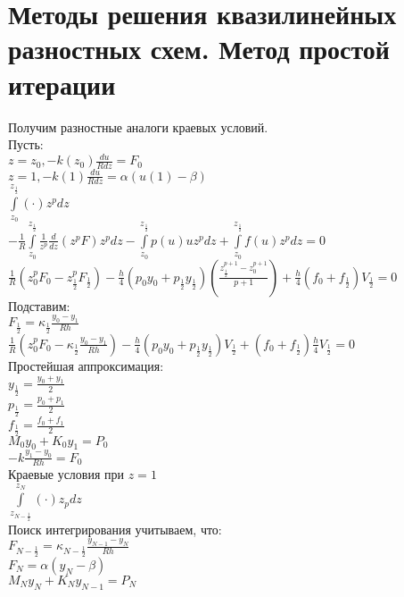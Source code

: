 \section{Методы решения квазилинейных разностных схем. Метод простой итерации}
Получим разностные аналоги краевых условий.\\
Пусть:\\
$z = z_0, -k(z_0)\frac{du}{R dz} = F_0$\\
$z = 1, -k(1) \frac{du}{R dz} = \alpha(u(1) - \beta)$\\
$\int\limits_{z_0}^{z_{\frac{1}{2}}}(\cdot)z^p dz$\\
$-\frac{1}{R}\int\limits_{z_0}^{z_{\frac{1}{2}}}\frac{1}{z^p} \frac{d}{dz} (z^p F) z^p dz - \int\limits_{z_0}^{z_{\frac{1}{2}}} p(u) u z^p dz + \int\limits_{z_0}^{z_{\frac{1}{2}}} f(u) z^p dz = 0$\\
$\frac{1}{R} (z_0^p F_0 - z^p_{\frac{1}{2}} F_{\frac{1}{2}}) - \frac{h}{4}(p_0 y_0 + p_{\frac{1}{2}} y_{\frac{1}{2}})(\frac{z^{p+1}_{\frac{1}{2}} - z_0^{p+1}}{p+1}) + \frac{h}{4}(f_0 + f_{\frac{1}{2}})V_{\frac{1}{2}} = 0$\\

Подставим:\\
$F_{\frac{1}{2}} = \kappa_{\frac{1}{2}} \frac{y_0 - y_1}{Rh}$\\
$\frac{1}{R}(z_0^p F_0 - \kappa_{\frac{1}{2}}\frac{y_0 - y_1}{Rh}) - \frac{h}{4}(p_0 y_0 + p_{\frac{1}{2}} y_{\frac{1}{2}}) V_{\frac{1}{2}} + (f_0 + f_{\frac{1}{2}})\frac{h}{4} V_{\frac{1}{2}} = 0$\\
Простейшая аппроксимация:\\

$y_\frac{1}{2} = \frac{y_0 + y_1}{2}$\\
$p_\frac{1}{2} = \frac{p_0 + p_1}{2}$\\
$f_\frac{1}{2} = \frac{f_0 + f_1}{2}$\\

$M_0 y_0 + K_0 y_1 = P_0$\\
$-k\frac{y_1 - y_0}{Rh} = F_0$\\

Краевые условия при $z = 1$\\
$\int\limits_{z_{N-\frac{1}{2}}}^{z_N} (\cdot) z_p dz$\\
Поиск интегрирования учитываем, что:\\
$F_{N-\frac{1}{2}} = \kappa_{N-\frac{1}{2}}\frac{y_{N-1} - y_N}{Rh}$\\
$F_N = \alpha(y_N - \beta)$\\
$M_N y_N + K_N y_{N-1} = P_N$\\

